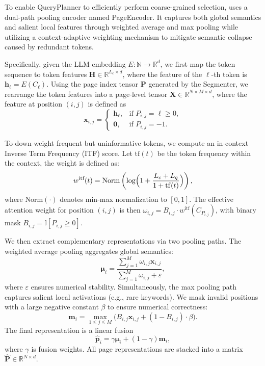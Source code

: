 \documentclass[11pt]{article}
\newcommand{\ours}{\text{BEAVER}\xspace}
\begin{document}
To enable QueryPlanner to efficiently perform coarse-grained selection, \ours uses a dual-path pooling encoder named PageEncoder. It captures both global semantics and salient local features through weighted average and max pooling while utilizing a context-adaptive weighting mechanism to mitigate semantic collapse caused by redundant tokens.

Specifically, given the LLM embedding $E:\mathbb{N}\rightarrow\mathbb{R}^{d}$, we first map the token sequence to token features $\mathbf{H}\in\mathbb{R}^{L_c\times d}$, where the feature of the $\ell$-th token is $\mathbf{h}_\ell=E(C_\ell)$. Using the page index tensor $\mathbf{P}$ generated by the Segmenter, we rearrange the token features into a page-level tensor $\mathbf{X}\in\mathbb{R}^{N\times M\times d}$, where the feature at position $(i,j)$ is defined as
\begin{equation}
    \mathbf{x}_{i,j}=
    \begin{cases}
    \mathbf{h}_{\ell}, & \text{if } P_{i,j}=\ell\ge0,\\[2pt]
    \mathbf{0}, & \text{if } P_{i,j}=-1.
    \end{cases}
\end{equation}

To down-weight frequent but uninformative tokens, we compute an in-context Inverse Term Frequency (ITF) score. Let $\mathrm{tf}(t)$ be the token frequency within the context, the weight is defined as:
\begin{equation}
    w^{\text{itf}}(t)=\text{Norm}\left(\log\Bigl(1+\frac{L_c+L_q}{1+\mathrm{tf}(t)}\Bigr)\right),
\end{equation}
where $\text{Norm}(\cdot)$ denotes min-max normalization to $[0,1]$. The effective attention weight for position $(i,j)$ is then $\omega_{i,j}= B_{i,j}\cdot w^{\text{itf}}(C_{P_{i,j}})$, with binary mask $B_{i,j}=\mathbb{I}[P_{i,j}\ge0]$.

We then extract complementary representations via two pooling paths. The weighted average pooling aggregates global semantics:
\begin{equation}
    \boldsymbol{\mu}_i=\frac{\sum_{j=1}^{M}\omega_{i,j}\mathbf{x}_{i,j}}{\sum_{j=1}^{M}\omega_{i,j}+\varepsilon},
\end{equation}
where $\varepsilon$ ensures numerical stability. Simultaneously, the max pooling path captures salient local activations (e.g., rare keywords). We mask invalid positions with a large negative constant $\beta$ to ensure numerical correctness:
\begin{equation}
\mathbf{m}_i = \max_{1\le j\le M}\bigl(B_{i,j}\mathbf{x}_{i,j}+(1-B_{i,j})\cdot\beta\bigr).
\end{equation}
The final representation is a linear fusion
\begin{equation}
\hat{\mathbf{p}}_i=\gamma\boldsymbol{\mu}_i+(1-\gamma)\mathbf{m}_i,
\end{equation}
where $\gamma$ is fusion weights. All page representations are stacked into a matrix $\hat{\mathbf{P}}\in\mathbb{R}^{N\times d}$.
\end{document}
